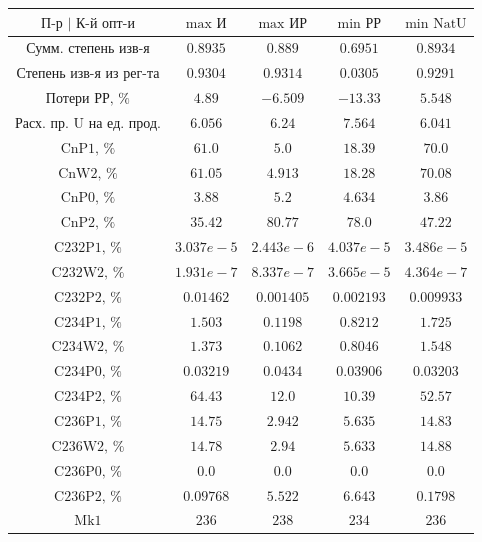 \begin{table}
    \begin{tabular}{ccccc}
        $\text{П-р | К-й опт-и}$ & $\text{max И}$ & $\text{max ИР}$ & $\text{min РР}$ & $\text{min NatU}$\\ \hline
        $\text{Сумм. степень изв-я}$ & $0.8935$ & $0.889$ & $0.6951$ & $0.8934$\\ \hline
        $\text{Степень изв-я из рег-та}$ & $0.9304$ & $0.9314$ & $0.0305$ & $0.9291$\\ \hline
        $\text{Потери РР, \%}$ & $4.89$ & $-6.509$ & $-13.33$ & $5.548$\\ \hline
        $\text{Расх. пр. U на ед. прод.}$ & $6.056$ & $6.24$ & $7.564$ & $6.041$\\ \hline
        $\text{CnP1, \%}$ & $61.0$ & $5.0$ & $18.39$ & $70.0$\\ \hline
        $\text{CnW2, \%}$ & $61.05$ & $4.913$ & $18.28$ & $70.08$\\ \hline
        $\text{CnP0, \%}$ & $3.88$ & $5.2$ & $4.634$ & $3.86$\\ \hline
        $\text{CnP2, \%}$ & $35.42$ & $80.77$ & $78.0$ & $47.22$\\ \hline
        $\text{C232P1, \%}$ & $3.037e-5$ & $2.443e-6$ & $4.037e-5$ & $3.486e-5$\\ \hline
        $\text{C232W2, \%}$ & $1.931e-7$ & $8.337e-7$ & $3.665e-5$ & $4.364e-7$\\ \hline
        $\text{C232P2, \%}$ & $0.01462$ & $0.001405$ & $0.002193$ & $0.009933$\\ \hline
        $\text{C234P1, \%}$ & $1.503$ & $0.1198$ & $0.8212$ & $1.725$\\ \hline
        $\text{C234W2, \%}$ & $1.373$ & $0.1062$ & $0.8046$ & $1.548$\\ \hline
        $\text{C234P0, \%}$ & $0.03219$ & $0.0434$ & $0.03906$ & $0.03203$\\ \hline
        $\text{C234P2, \%}$ & $64.43$ & $12.0$ & $10.39$ & $52.57$\\ \hline
        $\text{C236P1, \%}$ & $14.75$ & $2.942$ & $5.635$ & $14.83$\\ \hline
        $\text{C236W2, \%}$ & $14.78$ & $2.94$ & $5.633$ & $14.88$\\ \hline
        $\text{C236P0, \%}$ & $0.0$ & $0.0$ & $0.0$ & $0.0$\\ \hline
        $\text{C236P2, \%}$ & $0.09768$ & $5.522$ & $6.643$ & $0.1798$\\ \hline
        $\text{Mk1}$ & $236$ & $238$ & $234$ & $236$\\ \hline

\end{tabular}
\end{table}
